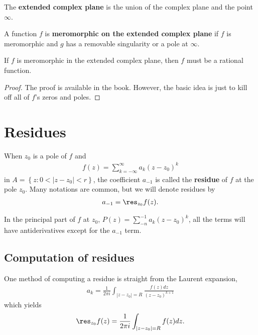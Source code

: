 \begin{definition}
    The \textbf{extended complex plane} is the union of the complex plane and the point $\infty$.
\end{definition}

\begin{definition}
    A function $f$ is \textbf{meromorphic on the extended complex plane} if $f$ is meromorphic and $g$ has a removable singularity or a pole at $\infty$.
\end{definition}

\begin{thm}
    If $f$ is meromorphic in the extended complex plane, then $f$ must be a rational function.
\end{thm}
\begin{proof}
    The proof is available in the book. However, the basic idea is just to kill off all of $f$'s zeros and poles.
\end{proof}

\section{Residues}

\begin{definition}
    When $z_0$ is a pole of $f$ and
    \begin{align*}
        f(z)=\sum_{k=-\infty}^\infty a_k(z-z_0)^k
    \end{align*}
    in $A=\left\{ z:0<|z-z_0|<r \right\}$, the coefficient $a_{-1}$ is called the \textbf{residue} of $f$ at the pole $z_0$.
    Many notations are common, but we will denote residues by
    \begin{align*}
        a_{-1}=\res_{z_0} f(z).
    \end{align*}
\end{definition}

\begin{remark}
    In the principal part of $f$ at $z_0$, $P(z)=\sum_{-n}^{-1}a_k(z-z_0)^k$,
    all the terms will have antiderivatives except for the $a_{-1}$ term.
\end{remark}

\subsection{Computation of residues}

One method of computing a residue is straight from the Laurent expansion,
\begin{align*}
    a_k=\frac{1}{2\pi i}\int_{|z-z_0|=R} \frac{f(z) dz}{(z-z_0)^{k+1}}
\end{align*}
which yields
\begin{align*}
    \res_{z_0}f(z)=\frac{1}{2\pi i}\int_{|z-z_0|=R}f(z)dz.
\end{align*}

